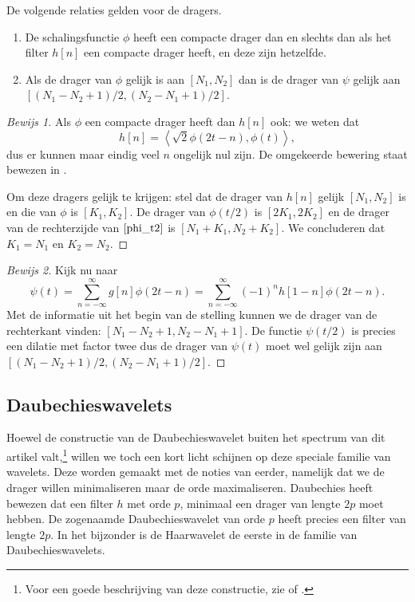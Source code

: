 \begin{stelling}
  De volgende relaties gelden voor de dragers.
  \begin{enumerate}
  \item De schalingsfunctie $\phi$ heeft een compacte drager dan en slechts dan als het filter $h[n]$ een compacte drager heeft, en deze zijn hetzelfde.
  \item Als de drager van $\phi$ gelijk is aan $[N_1,N_2]$ dan is de drager van $\psi$ gelijk aan $[(N_1 - N_2 + 1)/2, (N_2 - N_1 + 1)/2]$.
  \end{enumerate}
\end{stelling}
\begin{proof}[Bewijs 1] Als $\phi$ een compacte drager heeft dan $h[n]$ ook: we weten dat
  \begin{equation*}
    h[n] = \left\langle \sqrt{2} \phi\left(2t-n\right), \phi(t) \right\rangle,
  \end{equation*}
  dus er kunnen maar eindig veel $n$ ongelijk nul zijn. De omgekeerde bewering staat bewezen in 
  \cite[P965-967]{daubechies}.

  Om deze dragers gelijk te krijgen: stel dat de drager van $h[n]$ gelijk $[N_1,N_2]$ is
  en die van $\phi$ is $[K_1, K_2]$. De drager van $\phi(t/2)$ is $[2K_1, 2K_2]$ en de drager van de rechterzijde 
  van $\eqref{phi_t2}$ is $[N_1 + K_1, N_2 + K_2]$. We concluderen dat $K_1 = N_1$ en $K_2 = N_2$.
\end{proof}
\begin{proof}[Bewijs 2]
  Kijk nu naar
  \[
  \psi\left(t\right) = \sum_{n=-\infty}^{\infty} g[n] \phi(2t-n) = \sum_{n=-\infty}^{\infty} (-1)^{n}h[1-n] \phi(2t-n).
  \]
  Met de informatie uit het begin van de stelling kunnen we de drager van de rechterkant vinden: $[N_1 - N_2 + 1, N_2 - N_1 + 1]$. De functie $\psi(t/2)$ is precies een dilatie met factor twee dus de drager van $\psi(t)$ moet wel gelijk zijn aan $[(N_1 - N_2 + 1)/2, (N_2 - N_1 + 1)/2]$.
\end{proof}

\subsection{Daubechieswavelets}
Hoewel de constructie van de Daubechieswavelet buiten het spectrum van dit artikel valt,\footnote{Voor een goede beschrijving van deze constructie, zie \cite{mallat} of \cite{daubechies}.} willen we toch een kort licht schijnen op deze speciale familie van wavelets. Deze worden gemaakt met de noties van eerder, namelijk dat we de drager willen minimaliseren maar de orde maximaliseren. Daubechies heeft bewezen\cite{daubechies} dat een filter $h$ met orde $p$, minimaal een drager van lengte $2p$ moet hebben. De zogenaamde Daubechieswavelet van orde $p$ heeft precies een filter van lengte $2p$. In het bijzonder is de Haarwavelet de eerste in de familie van Daubechieswavelets.


